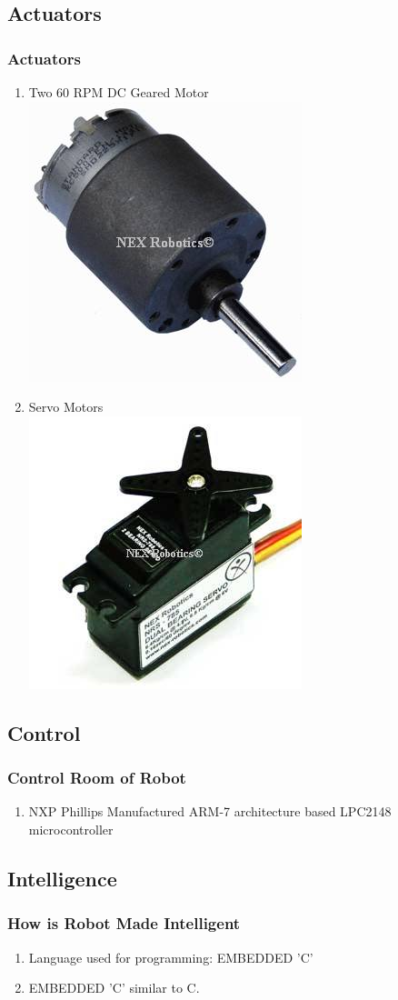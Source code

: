 \documentclass[10pt,red]{beamer}
\begin{document}
\subsection{Actuators}
\begin{frame}
	\frametitle{Actuators} \pause
		\begin{enumerate}
			\item<1->	Two 60 RPM DC Geared Motor \\[8pt] 
			\includegraphics[width=0.15\linewidth]{dc_motor} \\[10pt]
			\item<2->	Servo Motors\\[8pt]
			\includegraphics[width=0.15\linewidth]{servo} \hspace{2cm}
		\end{enumerate}
\end{frame}


\subsection{Control}
\begin{frame}
	\frametitle{Control Room of Robot} \pause
		\begin{enumerate}
			\item<1->	NXP Phillips Manufactured ARM-7 architecture based LPC2148 microcontroller 
		\end{enumerate}
\end{frame}


\subsection{Intelligence}
\begin{frame}
	\frametitle{How is Robot Made Intelligent} \pause
		\begin{enumerate}
			\item<1->	Language used for programming: EMBEDDED 'C'
			\item<2->	EMBEDDED 'C' similar to C.  
		\end{enumerate}
\end{frame}
\end{document}
